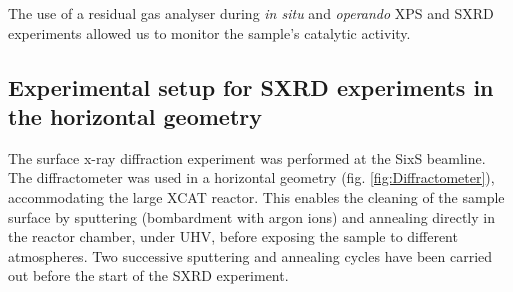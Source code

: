 \begin{table}[!htb]
\centering
{}
\caption{
    Different atmospheres used to probe the ammonia oxidation on Pt(100) and Pt(111) single crystals with NAP-XPS.
    The duration of each condition was approximately \qty{5}{\hour}.
}
\label{tab:ConditionsXPS}
\end{table}

The use of a residual gas analyser during \textit{in situ} and \textit{operando} XPS and SXRD experiments allowed us to monitor the sample's catalytic activity.

\subsection{Experimental setup for SXRD experiments in the horizontal geometry}\label{sec:SXRDSetupH}

The surface x-ray diffraction experiment was performed at the SixS beamline.
The diffractometer was used in a horizontal geometry (fig. \ref{fig:Diffractometer}), accommodating the large XCAT reactor.
This enables the cleaning of the sample surface by sputtering (bombardment with argon ions) and annealing directly in the reactor chamber, under UHV, before exposing the sample to different atmospheres.
Two successive sputtering and annealing cycles have been carried out before the start of the SXRD experiment.

